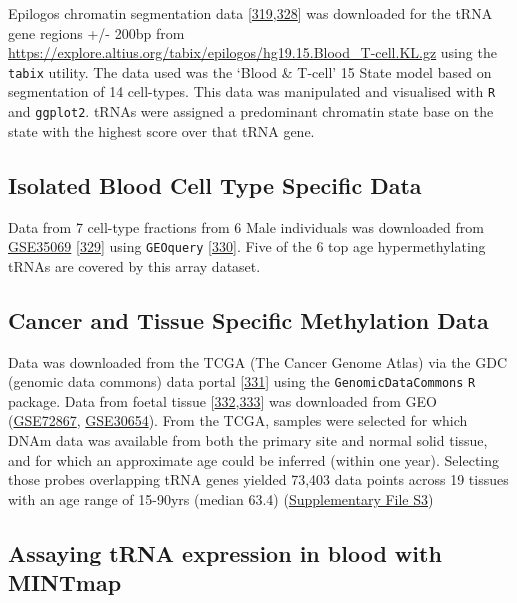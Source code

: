 \documentclass[
]{book}
\begin{document}
Epilogos chromatin segmentation data {[}\protect\hyperlink{ref-Ernst2011}{319},\protect\hyperlink{ref-Meuleman2019}{328}{]} was downloaded for the tRNA gene regions +/- 200bp from \url{https://explore.altius.org/tabix/epilogos/hg19.15.Blood_T-cell.KL.gz} using the \texttt{tabix} utility.
The data used was the `Blood \& T-cell' 15 State model based on segmentation of 14 cell-types.
This data was manipulated and visualised with \texttt{R} and \texttt{ggplot2}.
tRNAs were assigned a predominant chromatin state base on the state with the highest score over that tRNA gene.

\hypertarget{sortedbloodmethods}{%
\subsection{Isolated Blood Cell Type Specific Data}\label{sortedbloodmethods}}

Data from 7 cell-type fractions from 6 Male individuals was downloaded from \href{https://www.ncbi.nlm.nih.gov/geo/query/acc.cgi?acc=GSE35069}{GSE35069} {[}\protect\hyperlink{ref-Reinius2012}{329}{]} using \texttt{GEOquery} {[}\protect\hyperlink{ref-Davis2007p}{330}{]}.
Five of the 6 top age hypermethylating tRNAs are covered by this array dataset.

\hypertarget{TCGAmethods}{%
\subsection{Cancer and Tissue Specific Methylation Data}\label{TCGAmethods}}

Data was downloaded from the TCGA (The Cancer Genome Atlas) via the GDC (genomic data commons) data portal {[}\protect\hyperlink{ref-Grossman2016}{331}{]} using the \texttt{GenomicDataCommons} \texttt{R} package.
Data from foetal tissue {[}\protect\hyperlink{ref-Yang2016}{332},\protect\hyperlink{ref-Nazor2012}{333}{]} was downloaded from GEO (\href{https://www.ncbi.nlm.nih.gov/geo/query/acc.cgi?acc=GSE72867}{GSE72867}, \href{https://www.ncbi.nlm.nih.gov/geo/query/acc.cgi?acc=GSE30654}{GSE30654}).
From the TCGA, samples were selected for which DNAm data was available from both the primary site and normal solid tissue, and for which an approximate age could be inferred (within one year).
Selecting those probes overlapping tRNA genes yielded 73,403 data points across 19 tissues with an age range of 15-90yrs (median 63.4) (\href{./Supplementary_Files/TCGA_samples_used.tsv}{Supplementary File S3})

\hypertarget{mintmapmethods}{%
\subsection{Assaying tRNA expression in blood with MINTmap}\label{mintmapmethods}}
\end{document}
